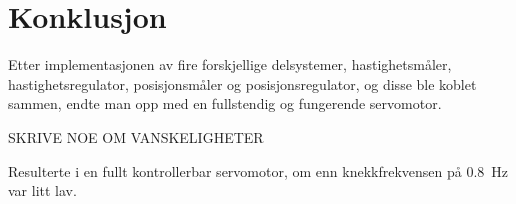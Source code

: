 \section{Konklusjon}\label{sec:konklusjon}

Etter implementasjonen av fire forskjellige delsystemer, hastighetsmåler, hastighetsregulator, posisjonsmåler og posisjonsregulator, og disse ble koblet sammen, endte man opp med en fullstendig og fungerende servomotor. 


SKRIVE NOE OM VANSKELIGHETER

Resulterte i en fullt kontrollerbar servomotor, om enn knekkfrekvensen på {\SI{0.8}{\hertz}} var litt lav.


